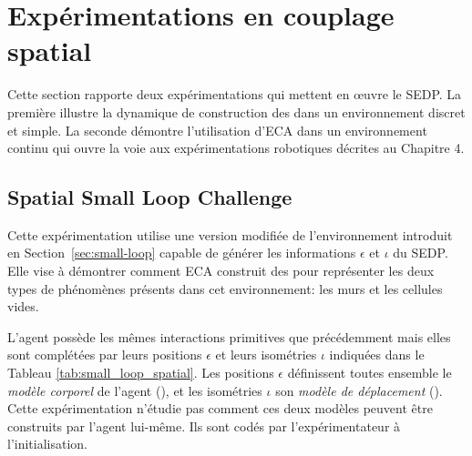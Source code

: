 \section{Expérimentations en couplage spatial}
\label{sec:couplage_spatial}

\noindent
Cette section rapporte deux expérimentations qui mettent en \oe uvre le SEDP.
La première illustre la dynamique de construction des  dans un environnement discret et simple.
La seconde démontre l'utilisation d'ECA dans un environnement continu qui ouvre la voie aux expérimentations robotiques décrites au Chapitre 4. 

\subsection{Spatial Small Loop Challenge}

\noindent
Cette expérimentation utilise une version modifiée de l'environnement  introduit en Section~\ref{sec:small-loop} capable de générer les informations $\epsilon$ et $\iota$ du SEDP.
Elle vise à démontrer comment ECA construit des  pour représenter les deux types de phénomènes présents dans cet environnement: les murs et les cellules vides.

L'agent possède les mêmes interactions primitives que précédemment mais elles sont complétées par leurs positions $\epsilon$ et leurs isométries $\iota$ indiquées dans le Tableau \ref{tab:small_loop_spatial}.
Les positions $\epsilon$ définissent toutes ensemble le \emph{modèle corporel} de l'agent (), et les isométries $\iota$ son \emph{modèle de déplacement} ().
Cette expérimentation n'étudie pas comment ces deux modèles peuvent être construits par l'agent lui-même. 
Ils sont codés par l'expérimentateur à l'initialisation. 


